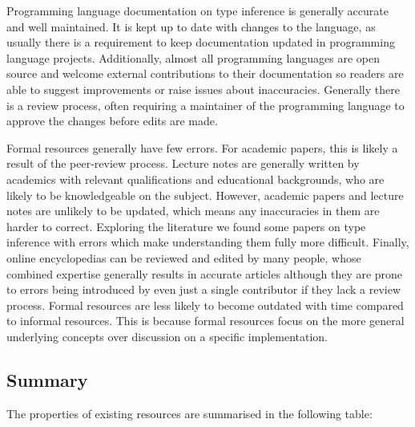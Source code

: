 \documentclass[a4paper,fleqn,oneside,12pt]{report}
\begin{document}
Programming language documentation on type inference is generally accurate and well maintained. It is kept up to date with changes to the language, as usually there is a requirement to keep documentation updated in programming language projects. Additionally, almost all programming languages are open source and welcome external contributions to their documentation so readers are able to suggest improvements or raise issues about inaccuracies. Generally there is a review process, often requiring a maintainer of the programming language to approve the changes before edits are made.

Formal resources generally have few errors. For academic papers, this is likely a result of the peer-review process. Lecture notes are generally written by academics with relevant qualifications and educational backgrounds, who are likely to be knowledgeable on the subject. However, academic papers and lecture notes are unlikely to be updated, which means any inaccuracies in them are harder to correct. Exploring the literature we found some papers on type inference with errors which make understanding them fully more difficult. Finally, online encyclopedias can be reviewed and edited by many people, whose combined expertise generally results in accurate articles although they are prone to errors being introduced by even just a single contributor if they lack a review process. Formal resources are less likely to become outdated with time compared to informal resources. This is because formal resources focus on the more general underlying concepts over discussion on a specific implementation.

\subsection{Summary}

The properties of existing resources are summarised in the following table:
\newline
\end{document}
